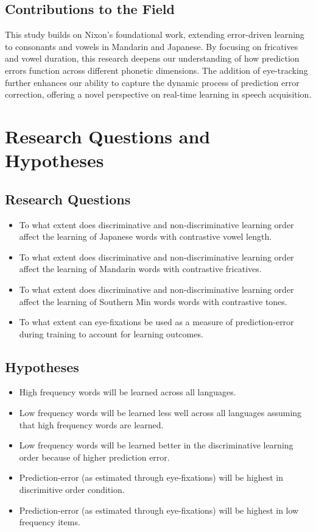 \subsection{Contributions to the Field}

This study builds on Nixon's foundational work, extending error-driven learning to consonants and vowels in Mandarin and Japanese. By focusing on fricatives and vowel duration, this research deepens our understanding of how prediction errors function across different phonetic dimensions. The addition of eye-tracking further enhances our ability to capture the dynamic process of prediction error correction, offering a novel perspective on real-time learning in speech acquisition.

\section{Research Questions and Hypotheses}

\subsection{Research Questions}

\begin{itemize}
    \item  To what extent does discriminative and non-discriminative learning order affect the learning of Japanese words with contrastive vowel length.
    \item To what extent does discriminative and non-discriminative learning order affect the learning of Mandarin words with contrastive fricatives.
    \item To what extent does discriminative and non-discriminative learning order affect the learning of Southern Min words words with contrastive tones.
   \item To what extent can eye-fixations be used as a measure of prediction-error during training to account for learning outcomes.
\end{itemize}

\subsection{Hypotheses}

\begin{itemize}
    \item High frequency words will be learned across all languages. 
    \item Low frequency words will be learned less well across all languages assuming that high frequency words are learned.
    \item Low frequency words will be learned better in the discriminative learning order because of higher prediction error.
    \item Prediction-error (as estimated through eye-fixations) will be highest in discrimitive order condition. 
    \item Prediction-error (as estimated through eye-fixations) will be highest in low frequency items.
\end{itemize}